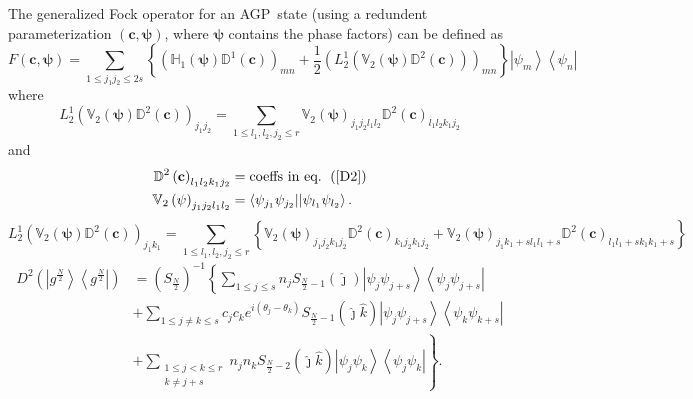 \documentclass[aps,preprint]{revtex4}%
\begin{document}
The generalized Fock operator for an AGP\ state (using a redundent
parameterization $\left(  \mathbf{c,\psi}\right)  $, where $\mathbf{\psi}$
contains the phase factors) can be defined as
\[
F\left(  \mathbf{c,\psi}\right)  =\sum_{1\leq j_{1}j_{2}\leq2s}\left\{
\left(  \mathbb{H}_{1}\left(  \mathbf{\psi}\right)  \mathbb{D}^{1}\left(
\mathbf{c}\right)  \right)  _{mn}+\frac{1}{2}\left(  L_{2}^{1}\left(
\mathbb{V}_{2}\left(  \mathbf{\psi}\right)  \mathbb{D}^{2}\left(
\mathbf{c}\right)  \right)  \right)  _{mn}\right\}  \left\vert \psi
_{m}\right\rangle \left\langle \psi_{n}\right\vert
\]
where%
\[
L_{2}^{1}\left(  \mathbb{V}_{2}\left(  \mathbf{\psi}\right)  \mathbb{D}%
^{2}\left(  \mathbf{c}\right)  \right)  _{j_{1}j_{2}}=\sum_{1\leq l_{1}%
,l_{2},j_{2}\leq r}\mathbb{V}_{2}\left(  \mathbf{\psi}\right)  _{j_{1}%
j_{2}l_{1}l_{2}}\mathbb{D}^{2}\left(  \mathbf{c}\right)  _{l_{1}l_{2}%
k_{1}j_{2}}%
\]
and
\begin{align*}
\mathbb{D}^{2}\left(  \mathbf{c}\right)  _{l_{1}l_{2}k_{1}j_{2}}  &
=\text{coeffs in eq. }\left(  \ref{D2}\right) \\
\mathbb{V}_{2}\left(  \mathbf{\psi}\right)  _{j_{1}j_{2}l_{1}l_{2}}  &
=\left\langle \psi_{j_{1}}\psi_{j_{2}}||\psi_{l_{1}}\psi_{l_{2}}\right\rangle
.
\end{align*}%
\[
L_{2}^{1}\left(  \mathbb{V}_{2}\left(  \mathbf{\psi}\right)  \mathbb{D}%
^{2}\left(  \mathbf{c}\right)  \right)  _{j_{1}k_{1}}=\sum_{1\leq l_{1}%
,l_{2},j_{2}\leq r}\left\{  \mathbb{V}_{2}\left(  \mathbf{\psi}\right)
_{j_{1}j_{2}k_{1}j_{2}}\mathbb{D}^{2}\left(  \mathbf{c}\right)  _{k_{1}%
j_{2}k_{1}j_{2}}+\mathbb{V}_{2}\left(  \mathbf{\psi}\right)  _{j_{1}%
k_{1}+sl_{1}l_{1}+s}\mathbb{D}^{2}\left(  \mathbf{c}\right)  _{l_{1}%
l_{1}+sk_{1}k_{1}+s}\right\}
\]%
\begin{align}
D^{2}\left(  \left\vert g^{\frac{N}{2}}\right\rangle \left\langle g^{\frac
{N}{2}}\right\vert \right)   &  =\left(  S_{\frac{N}{2}}\right)  ^{-1}\left\{
\sum_{1\leq j\leq s}n_{j}S_{\frac{N}{2}-1}\left(  \hat{\jmath}\right)
\left\vert \psi_{j}\psi_{j+s}\right\rangle \left\langle \psi_{j}\psi
_{j+s}\right\vert \right. \nonumber\\
&  +\sum_{1\leq j\neq k\leq s}c_{j}c_{k}e^{i\left(  \theta_{j}-\theta
_{k}\right)  }S_{\frac{N}{2}-1}\left(  \hat{\jmath}\hat{k}\right)  \left\vert
\psi_{j}\psi_{j+s}\right\rangle \left\langle \psi_{k}\psi_{k+s}\right\vert
\nonumber\\
&  \left.  +\sum_{\substack{1\leq j<k\leq r\\k\neq j+s}}n_{j}n_{k}S_{\frac
{N}{2}-2}\left(  \hat{\jmath}\hat{k}\right)  \left\vert \psi_{j}\psi
_{k}\right\rangle \left\langle \psi_{j}\psi_{k}\right\vert \right\}  .
\end{align}
\end{document}
